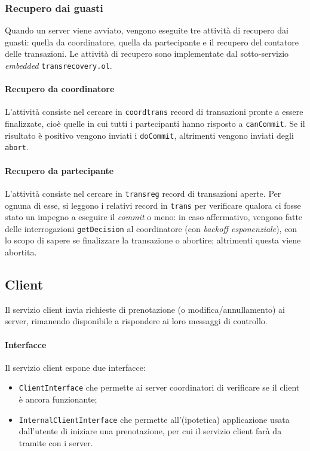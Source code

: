 \documentclass[a4paper]{article}
\begin{document}
\subsubsection{Recupero dai guasti}

Quando un server viene avviato, vengono eseguite tre attività di recupero dai guasti: quella da coordinatore, quella da partecipante e il recupero del contatore delle transazioni. Le attività di recupero sono implementate dal sotto-servizio \textit{embedded} \texttt{transrecovery.ol}.

\paragraph{Recupero da coordinatore} L'attività consiste nel cercare in \texttt{coordtrans} record di transazioni pronte a essere finalizzate, cioè quelle in cui tutti i partecipanti hanno risposto a \texttt{canCommit}. Se il risultato è positivo vengono inviati i \texttt{doCommit}, altrimenti vengono inviati degli \texttt{abort}.

\paragraph{Recupero da partecipante} L'attività consiste nel cercare in \texttt{transreg} record di transazioni aperte. Per ognuna di esse, si leggono i relativi record in \texttt{trans} per verificare qualora ci fosse stato un impegno a eseguire il \textit{commit} o meno: in caso affermativo, vengono fatte delle interrogazioni \texttt{getDecision} al coordinatore (con \textit{backoff esponenziale}), con lo scopo di sapere se finalizzare la transazione o abortire; altrimenti questa viene abortita.

\subsection{Client}
Il servizio client invia richieste di prenotazione (o modifica/annullamento) ai server, rimanendo disponibile a rispondere ai loro messaggi di controllo.

\paragraph{Interfacce} Il servizio client espone due interfacce:
\begin{itemize}
	\item \texttt{ClientInterface} che permette ai server coordinatori di verificare se il client è ancora funzionante;
	\item \texttt{InternalClientInterface} che permette all'(ipotetica) applicazione usata dall'utente di iniziare una prenotazione, per cui il servizio client farà da tramite con i server. 
\end{itemize}
\end{document}
